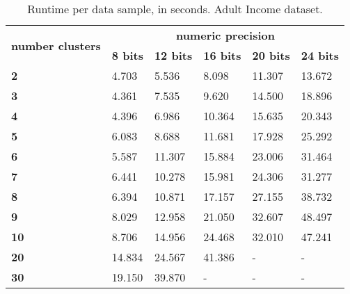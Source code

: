 \begin{table}[H]
\centering
\caption{Runtime per data sample, in seconds. Adult Income dataset.}
\label{table:runtimeKMAI}
\begin{tabular}{|l|l|l|l|l|l|}
\hline
\multirow{2}{*}{\textbf{number clusters}} & \multicolumn{5}{c}{\textbf{numeric precision}}                                              \\ \cline{2-6}
                                          & \textbf{8 bits} & \textbf{12 bits} & \textbf{16 bits} & \textbf{20 bits} & \textbf{24 bits} \\ \hline
\textbf{2}                                & 4.703           & 5.536            & 8.098            & 11.307           & 13.672           \\ \hline
\textbf{3}                                & 4.361           & 7.535            & 9.620            & 14.500           & 18.896           \\ \hline
\textbf{4}                                & 4.396           & 6.986            & 10.364           & 15.635           & 20.343           \\ \hline
\textbf{5}                                & 6.083           & 8.688            & 11.681           & 17.928           & 25.292           \\ \hline
\textbf{6}                                & 5.587           & 11.307           & 15.884           & 23.006           & 31.464           \\ \hline
\textbf{7}                                & 6.441           & 10.278           & 15.981           & 24.306           & 31.277           \\ \hline
\textbf{8}                                & 6.394           & 10.871           & 17.157           & 27.155           & 38.732           \\ \hline
\textbf{9}                                & 8.029           & 12.958           & 21.050           & 32.607           & 48.497           \\ \hline
\textbf{10}                               & 8.706           & 14.956           & 24.468           & 32.010           & 47.241           \\ \hline
\textbf{20}                               & 14.834          & 24.567           & 41.386           & -                & -                \\ \hline
\textbf{30}                               & 19.150          & 39.870           & -                & -                & -                \\ \hline

\end{tabular}
\end{table}
